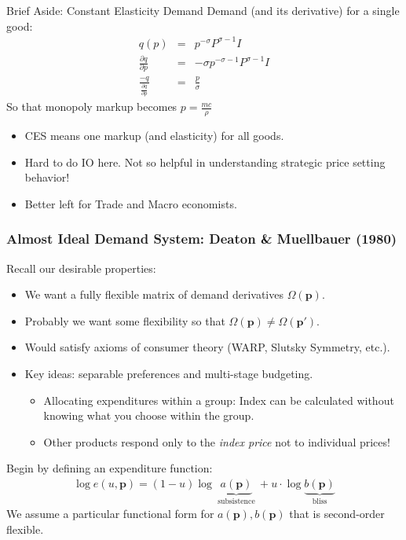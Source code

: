 \documentclass[xcolor=pdftex,dvipsnames,table,mathserif,aspectratio=169]{beamer}
\begin{document}
\begin{frame}{Brief Aside: Constant Elasticity Demand}
Demand (and its derivative) for a single good:
\begin{eqnarray*}
q(p) &=& p^{-\sigma} P^{\sigma-1} I \\
\frac{\partial q}{\partial p} &=& -\sigma p^{-\sigma-1} P^{\sigma-1} I\\
\frac{-q}{\frac{\partial q}{\partial p} } &=& \frac{p}{\sigma}
\end{eqnarray*}
So that monopoly markup becomes $ p = \frac{ mc}{\rho}$
\begin{itemize}
\item CES means one markup (and elasticity) for all goods.
\item Hard to do IO here. Not so helpful in understanding strategic price setting behavior!
\item Better left for Trade and Macro economists.
\end{itemize}
\end{frame}



\begin{frame}
\frametitle{Almost Ideal Demand System: Deaton \& Muellbauer (1980)}
Recall our desirable properties:
\begin{itemize}
\item We want a fully flexible matrix of demand derivatives $\Omega(\mathbf{p})$.
\item Probably we want some flexibility so that $\Omega(\mathbf{p}) \neq \Omega(\mathbf{p'})$.
\item Would satisfy axioms of consumer theory (WARP, Slutsky Symmetry, etc.).
\item Key ideas: \alert{separable preferences} and \alert{multi-stage budgeting}.
\begin{itemize}
\item Allocating expenditures within a group: Index can be calculated without knowing what you choose within the group. 
\item Other products respond only to the \textit{index price} not to individual prices!
\end{itemize}
\end{itemize}
Begin by defining an expenditure function:
\begin{eqnarray*}
\log e(u,\mathbf{p}) = (1- u) \log \underbrace{a(\mathbf{p})}_{\text{ subsistence }} + u \cdot \log \underbrace{b(\mathbf{p})}_{\text{ bliss }}
\end{eqnarray*}
We assume a particular functional form for $a(\mathbf{p}),b(\mathbf{p})$ that is second-order flexible.
\end{frame}
\end{document}
